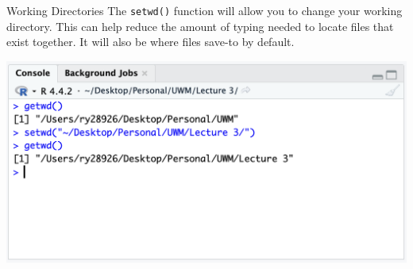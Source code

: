 \documentclass[aspectratio=169,xcolor=dvipsnames]{beamer}
\begin{document}
\begin{frame}{Working Directories}
The \texttt{setwd()} function will allow you to change your working directory. This can help reduce the amount of typing needed to locate files that exist together. It will also be where files save-to by default. 


\begin{center}
\includegraphics[scale=0.5]{images/setwd.png}
\end{center}
\end{frame}
\end{document}

